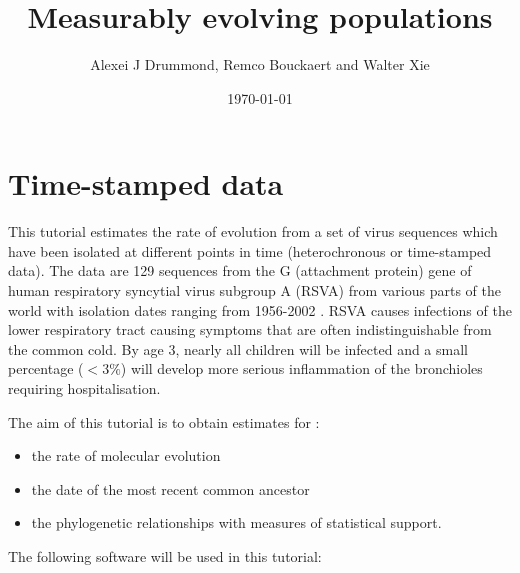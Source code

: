 \documentclass[12pt]{article}
\begin{document}
\author{Alexei J Drummond, Remco Bouckaert and Walter Xie}

\date{\today{}}

\title{Measurably evolving populations \label{chap.MEP}}
\maketitle




\section{Time-stamped data}

This tutorial estimates the rate of evolution from a set of virus sequences which have been isolated at different points in time (heterochronous or time-stamped data). The data are 129 sequences from the G (attachment protein) gene of human respiratory
syncytial virus subgroup A (RSVA) from various parts of the world with isolation dates ranging from 1956-2002 \cite{Zlateva:2004uq,Zlateva:2005qy}.
RSVA causes infections of the lower respiratory tract causing symptoms that are often indistinguishable from the common cold. By age 3, nearly all children will be infected and a small percentage ($<3\%$) will develop more serious inflammation of the bronchioles requiring hospitalisation.

The aim of this tutorial is to obtain estimates for :

\begin{itemize}
\item the rate of molecular evolution
\item the date of the most recent common ancestor
\item the phylogenetic relationships with measures of statistical support.
\end{itemize}

The following software will be used in this tutorial:
\end{document}
